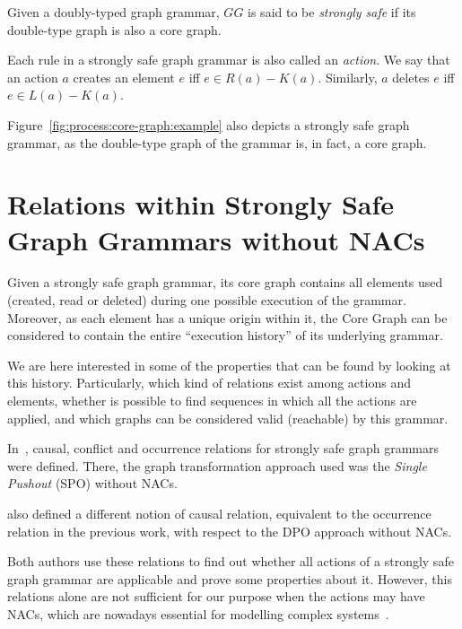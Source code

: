 \begin{definition} Given \doublyTypedGraphGrammarCore{} a doubly-typed graph grammar, $GG$ is said to be \emph{strongly safe} if its double-type graph is also a core graph.

  Each rule in a strongly safe graph grammar is also called an \emph{action}. We say that an action $a$ creates an element $e$ iff $e \in R(a) - K(a)$. Similarly, $a$ deletes $e$ iff \mbox{$e \in L(a) - K(a)$}.
\end{definition}

\begin{example} Figure~\ref{fig:process:core-graph:example} also depicts a strongly safe graph grammar, as the double-type graph of the grammar is, in fact, a core graph.
\end{example}

\section{Relations within Strongly Safe Graph Grammars without NACs}

Given a strongly safe graph grammar, its core graph contains all elements used (created, read or deleted) during one possible execution of the grammar. Moreover, as each element has a unique origin within it, the Core Graph can be considered to contain the entire ``execution history'' of its underlying grammar. 

We are here interested in some of the properties that can be found by looking at this history. Particularly, which kind of relations exist among actions and elements, whether is possible to find sequences in which all the actions are applied, and which graphs can be considered valid (reachable) by this grammar.

In~\cite{Ribeiro1996}, causal, conflict and occurrence relations for strongly safe graph grammars were defined. There, the graph transformation approach used was the \emph{Single Pushout} (SPO) without NACs. 

\cite{Corradini1996} also defined a different notion of causal relation, equivalent to the occurrence relation in the previous work, with respect to the DPO approach without NACs.

Both authors use these relations to find out whether all actions of a strongly safe graph grammar are applicable and prove some properties about it. However, this relations alone are not sufficient for our purpose when the actions may have NACs, which are nowadays essential for modelling complex systems~\cite{Corradini2014}.

